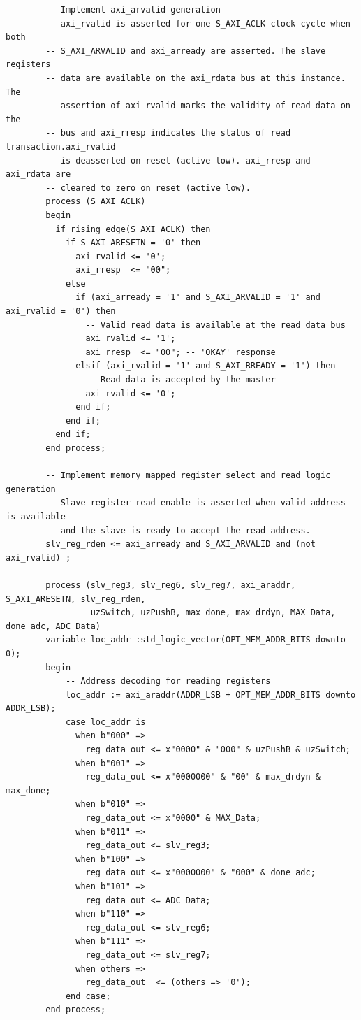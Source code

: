 \begin{verbatim}
        -- Implement axi_arvalid generation
        -- axi_rvalid is asserted for one S_AXI_ACLK clock cycle when both 
        -- S_AXI_ARVALID and axi_arready are asserted. The slave registers 
        -- data are available on the axi_rdata bus at this instance. The 
        -- assertion of axi_rvalid marks the validity of read data on the 
        -- bus and axi_rresp indicates the status of read transaction.axi_rvalid 
        -- is deasserted on reset (active low). axi_rresp and axi_rdata are 
        -- cleared to zero on reset (active low).  
        process (S_AXI_ACLK)
        begin
          if rising_edge(S_AXI_ACLK) then
            if S_AXI_ARESETN = '0' then
              axi_rvalid <= '0';
              axi_rresp  <= "00";
            else
              if (axi_arready = '1' and S_AXI_ARVALID = '1' and axi_rvalid = '0') then
                -- Valid read data is available at the read data bus
                axi_rvalid <= '1';
                axi_rresp  <= "00"; -- 'OKAY' response
              elsif (axi_rvalid = '1' and S_AXI_RREADY = '1') then
                -- Read data is accepted by the master
                axi_rvalid <= '0';
              end if;            
            end if;
          end if;
        end process;
    
        -- Implement memory mapped register select and read logic generation
        -- Slave register read enable is asserted when valid address is available
        -- and the slave is ready to accept the read address.
        slv_reg_rden <= axi_arready and S_AXI_ARVALID and (not axi_rvalid) ;
    
        process (slv_reg3, slv_reg6, slv_reg7, axi_araddr, S_AXI_ARESETN, slv_reg_rden,
                 uzSwitch, uzPushB, max_done, max_drdyn, MAX_Data, done_adc, ADC_Data)
        variable loc_addr :std_logic_vector(OPT_MEM_ADDR_BITS downto 0);
        begin
            -- Address decoding for reading registers
            loc_addr := axi_araddr(ADDR_LSB + OPT_MEM_ADDR_BITS downto ADDR_LSB);
            case loc_addr is
              when b"000" =>
                reg_data_out <= x"0000" & "000" & uzPushB & uzSwitch;
              when b"001" =>
                reg_data_out <= x"0000000" & "00" & max_drdyn & max_done;
              when b"010" =>
                reg_data_out <= x"0000" & MAX_Data;
              when b"011" =>
                reg_data_out <= slv_reg3;
              when b"100" =>
                reg_data_out <= x"0000000" & "000" & done_adc;
              when b"101" =>
                reg_data_out <= ADC_Data;
              when b"110" =>
                reg_data_out <= slv_reg6;
              when b"111" =>
                reg_data_out <= slv_reg7;
              when others =>
                reg_data_out  <= (others => '0');
            end case;
        end process; 
    

\end{verbatim}
